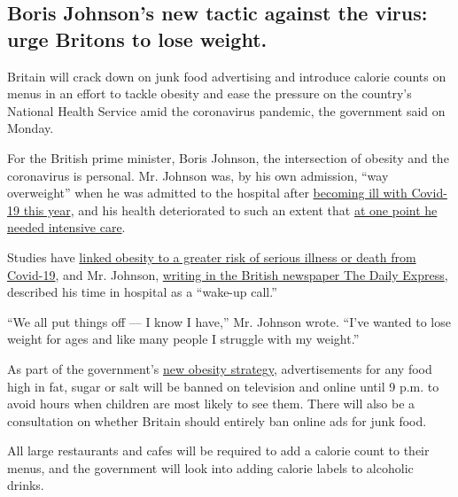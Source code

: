 \hypertarget{boris-johnsons-new-tactic-against-the-virus-urge-britons-to-lose-weight}{%
\subsection{Boris Johnson's new tactic against the virus: urge Britons
to lose
weight.}\label{boris-johnsons-new-tactic-against-the-virus-urge-britons-to-lose-weight}}

Britain will crack down on junk food advertising and introduce calorie
counts on menus in an effort to tackle obesity and ease the pressure on
the country's National Health Service amid the coronavirus pandemic, the
government said on Monday.

For the British prime minister, Boris Johnson, the intersection of
obesity and the coronavirus is personal. Mr. Johnson was, by his own
admission, ``way overweight'' when he was admitted to the hospital after
\href{https://www.nytimes.com/2020/04/05/world/europe/coronavirus-queen-elizabeth-speech.html}{becoming
ill with Covid-19 this year}, and his health deteriorated to such an
extent that
\href{https://www.nytimes.com/2020/04/09/world/europe/coronavirus-boris-johnson-britain.html}{at
one point he needed intensive care}.

Studies have
\href{https://www.nytimes.com/2020/04/16/health/coronavirus-obesity-higher-risk.html}{linked
obesity to a greater risk of serious illness or death from Covid-19},
and Mr. Johnson,
\href{https://www.express.co.uk/news/uk/1314742/Boris-Johnson-health-reforms-obesity-latest}{writing
in the British newspaper The Daily Express}, described his time in
hospital as a ``wake-up call.''

``We all put things off --- I know I have,'' Mr. Johnson wrote. ``I've
wanted to lose weight for ages and like many people I struggle with my
weight.''

As part of the government's
\href{https://www.gov.uk/government/news/new-obesity-strategy-unveiled-as-country-urged-to-lose-weight-to-beat-coronavirus-covid-19-and-protect-the-nhs}{new
obesity strategy}, advertisements for any food high in fat, sugar or
salt will be banned on television and online until 9 p.m. to avoid hours
when children are most likely to see them. There will also be a
consultation on whether Britain should entirely ban online ads for junk
food.

All large restaurants and cafes will be required to add a calorie count
to their menus, and the government will look into adding calorie labels
to alcoholic drinks.

